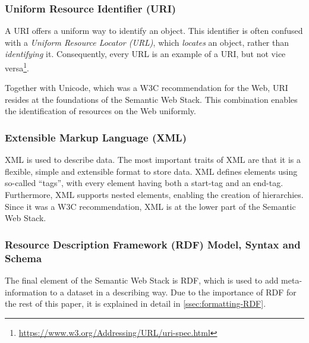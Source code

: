 \subsubsection{Uniform Resource Identifier (URI)}
A URI offers a uniform way to identify an object. This identifier is often confused with a \emph{Uniform Resource Locator (URL)}, which \emph{locates} an object, rather than \emph{identifying} it. Consequently, every URL is an example of a URI, but not vice versa\footnote{\url{https://www.w3.org/Addressing/URL/uri-spec.html}}.

\noindent Together with Unicode, which was a W3C recommendation for the Web, URI resides at the foundations of the Semantic Web Stack. This combination enables the identification of resources on the Web uniformly.

\subsubsection{Extensible Markup Language (XML)}
XML is used to describe data. The most important traits of XML are that it is a flexible, simple and extensible format to store data. XML defines elements using so-called ``tags'', with every element having both a start-tag and an end-tag. Furthermore, XML supports nested elements, enabling the creation of hierarchies. Since it was a W3C recommendation, XML is at the lower part of the Semantic Web Stack.

\subsubsection{Resource Description Framework (RDF) Model, Syntax and Schema}
The final element of the Semantic Web Stack is RDF, which is used to add meta-information to a dataset in a describing way. Due to the importance of RDF for the rest of this paper, it is explained in detail in \cref{ssec:formatting-RDF}.
